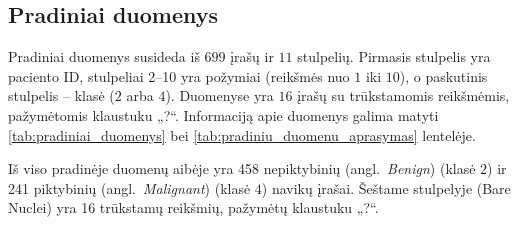\subsection{Pradiniai duomenys}
\label{subsec:pradiniai_duomenys}

Pradiniai duomenys susideda iš $699$ įrašų ir $11$ stulpelių. Pirmasis stulpelis yra paciento ID, stulpeliai 2–10 yra požymiai (reikšmės nuo $1$ iki $10$), o paskutinis stulpelis – klasė ($2$ arba $4$). Duomenyse yra $16$ įrašų su trūkstamomis reikšmėmis, pažymėtomis klaustuku „?“. Informaciją apie duomenys galima matyti \ref{tab:pradiniai_duomenys} bei \ref{tab:pradiniu_duomenu_aprasymas} lentelėje.




Iš viso pradinėje duomenų aibėje yra 458 nepiktybinių (angl.~\textit{Benign}) (klasė $2$) ir 241 piktybinių (angl.~\textit{Malignant}) (klasė $4$) navikų įrašai. Šeštame stulpelyje (Bare Nuclei) yra 16 trūkstamų reikšmių, pažymėtų klaustuku „?“.